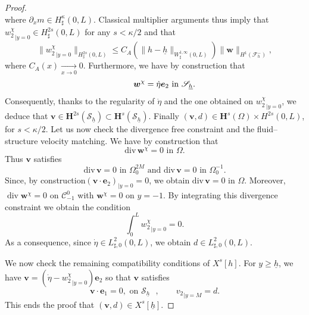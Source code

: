 \documentclass[JEP,XML,SOM,Unicode,NoFloatCountersInSection]{cedram}
\let\mathcal\mathscr
\theoremstyle{remark}
\theoremstyle{definition}
\newcommand{\vg}{\boldsymbol{v}}
\DeclareMathOperator{\DIV}{div}
\newcommand{\wg}{\boldsymbol{w}}
\newcommand{\BS}[1]{\boldsymbol{#1}}
\newcommand{\etap}{\dot{\eta}}
\newcommand{\hb}{{\underline{h}}}
\begin{document}
\begin{proof}
\[\]
where $\partial_x m\in H^\kappa_\sharp(0, L)$. Classical multiplier arguments thus imply that ${w_{2}^\chi}_{|{y=0}} \in H^{2s}_{\sharp}(0,L)$ for any $s < \kappa/2$ and that
\begin{equation} \label{eq.lapremieresurw2chi}
\|{w_{2}^\chi}_{|{y=0}}\|_{H^{2s}_{\sharp}(0,L)} \leq C_A(\|h-\hb\|_{W^{1,\infty}_{\sharp}(0,L)}) \|\wg\|_{H^1(\mathcal F^{-}_h)},
\end{equation}
where $C_{A}(x)\underset{x\to 0}{\to}0$.
Furthermore, we have by construction that
\[
\text{
\qquad $\wg^\chi= \etap \BS{e}_{2}$ in $\mathcal {S}_\hb$.}
\]
Consequently, thanks to the regularity of $\etap$ and the one obtained on ${{w}^\chi_{2}}_{|{y=0}}$, we deduce that $\vg\in \BS{H}^{2s}(\mathcal {S}_\hb)\subset \BS{H}^{s}(\mathcal {S}_\hb)$.
Finally $(\vg, d)\in \BS{H}^s(\Omega)\times H^{2s}(0, L)$, for $s<\kappa/2$.
Let us now check the divergence free constraint and the fluid--structure velocity matching.
We have by construction that
\[
\text{
$\text{div}\,\wg^\chi =0$ in $\Omega$.}
\]
Thus $\vg$ satisfies
\[
\text{
$\text{div}\,\vg =0$ in $\Omega^{2M}_{0}$ and $\text{div}\,\vg =0$ in $\Omega^{-1}_{0}$.}
\]
Since, by construction$(\vg\cdot\BS{e}_{2})_{|{y=0}}=0$, we obtain $\text{div}\,\vg =0$ in $\Omega$.
Moreover, $\DIV \wg^{\chi} = 0$ on $\mathcal C_{-1}^0$ with $\wg^{\chi} = 0$ on $y=-1$.
By integrating this divergence constraint we obtain the condition
\[
\int_{0}^L {w_{2}^\chi}_{|{y=0}} = 0.
\]
As a consequence, since $\dot\eta\in L^2_{\sharp,0}(0,L)$, we obtain $d \in L^2_{\sharp,0}(0,L)$.

We now check the remaining compatibility conditions of $X^s[h]$. For $y \geq \hb$, we have $\vg = ( \dot{\eta} - {w_{2}^\chi}_{|{y=0}}) \BS{e}_2$ so that $\vg$ satisfies
\[
\vg \cdot \BS{e}_1 = 0, \text{ on $\mathcal S_{\hb}$ }, \qquad {v_2}_{|{y=M}} = d.
\]
This ends the proof that $(\vg,d) \in X^s[\hb]$.


\end{proof}
\end{document}
